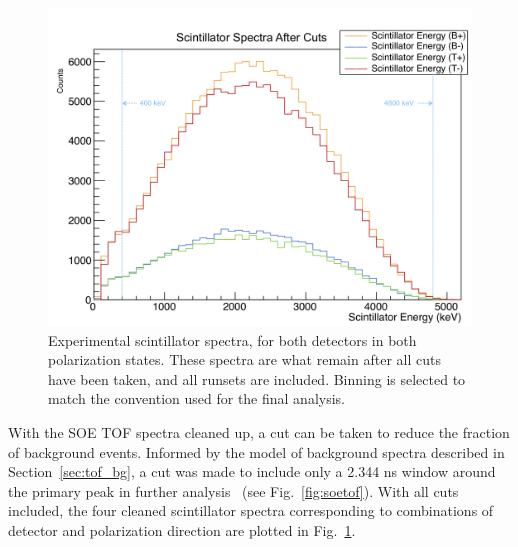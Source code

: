 \begin{figure}[h!!tb]
	\centering
	\includegraphics[width=.999\linewidth]
	{Figures/experimental_scintspectra_lin.png}
	\caption[Experimental Scintillator Spectra]{Experimental scintillator spectra, for both detectors in both polarization states.  These spectra are what remain after all cuts have been taken, and all runsets are included.  Binning is selected to match the convention used for the final analysis.  
	}	
	\label{fig:scintspectra}
\end{figure}

With the SOE TOF spectra cleaned up, a cut can be taken to reduce the fraction of background events.  Informed by the model of background spectra described in Section~\ref{sec:tof_bg}, a cut was made to include only a 2.344 ns window around the primary peak in further analysis~ (see Fig.~\ref{fig:soetof}).  With all cuts included, the four cleaned scintillator spectra corresponding to combinations of detector and polarization direction are plotted in Fig.~\ref{fig:scintspectra}.









